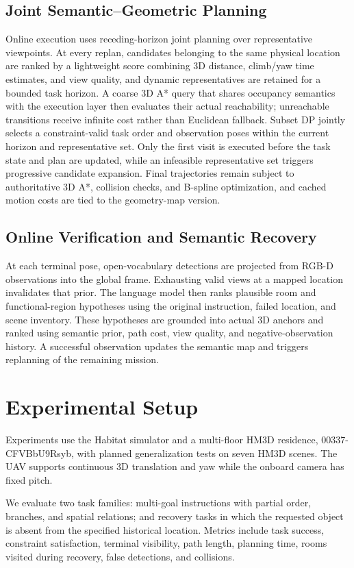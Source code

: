 \documentclass[11pt]{article}
\begin{document}
\subsection{Joint Semantic--Geometric Planning}
Online execution uses receding-horizon joint planning over representative viewpoints. At every replan, candidates belonging to the same physical location are ranked by a lightweight score combining 3D distance, climb/yaw time estimates, and view quality, and dynamic representatives are retained for a bounded task horizon. A coarse 3D A* query that shares occupancy semantics with the execution layer then evaluates their actual reachability; unreachable transitions receive infinite cost rather than Euclidean fallback. Subset DP jointly selects a constraint-valid task order and observation poses within the current horizon and representative set. Only the first visit is executed before the task state and plan are updated, while an infeasible representative set triggers progressive candidate expansion. Final trajectories remain subject to authoritative 3D A*, collision checks, and B-spline optimization, and cached motion costs are tied to the geometry-map version.

\subsection{Online Verification and Semantic Recovery}
At each terminal pose, open-vocabulary detections are projected from RGB-D observations into the global frame. Exhausting valid views at a mapped location invalidates that prior. The language model then ranks plausible room and functional-region hypotheses using the original instruction, failed location, and scene inventory. These hypotheses are grounded into actual 3D anchors and ranked using semantic prior, path cost, view quality, and negative-observation history. A successful observation updates the semantic map and triggers replanning of the remaining mission.

\section{Experimental Setup}
Experiments use the Habitat simulator and a multi-floor HM3D residence, 00337-CFVBbU9Rsyb, with planned generalization tests on seven HM3D scenes. The UAV supports continuous 3D translation and yaw while the onboard camera has fixed pitch. 

We evaluate two task families: multi-goal instructions with partial order, branches, and spatial relations; and recovery tasks in which the requested object is absent from the specified historical location. Metrics include task success, constraint satisfaction, terminal visibility, path length, planning time, rooms visited during recovery, false detections, and collisions.
\end{document}
